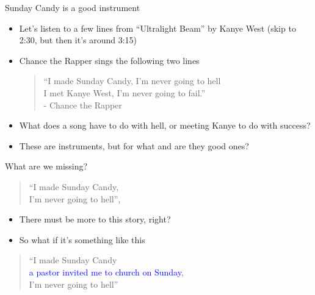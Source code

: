 \documentclass{beamer}
\begin{document}
\begin{frame}{Sunday Candy is a good instrument}

\begin{itemize}
		\item Let's listen to a few lines from ``Ultralight Beam'' by Kanye West (skip to 2:30, but then it's around 3:15)
		\item Chance the Rapper sings the following two lines

\bigskip

\begin{quote}
``I made Sunday Candy, I'm never going to hell \\


I met Kanye West, I'm never going to fail.'' \\


- Chance the Rapper
\end{quote}

	\item What does a song have to do with hell, or meeting Kanye to do with success?  
	\item These are instruments, but for what and are they good ones?
	\end{itemize}
\end{frame}

\begin{frame}{What are we missing?}

			\begin{quote}
			``I made Sunday Candy, \\
			I'm never going to hell'', 
			\end{quote}
		\begin{itemize}
		\item There must be more to this story, right?
		\item So what if it's something like this
		\end{itemize}
			\begin{quote}
			``I made Sunday Candy \\
			 \textcolor{blue}{a pastor invited me to church on Sunday}, \\
			  I'm never going to hell''
			\end{quote}

\end{frame}
\end{document}
